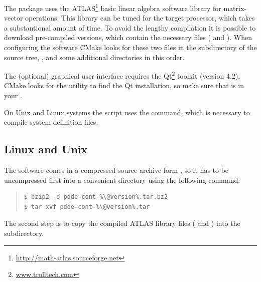 \documentclass[10pt,a4paper]{ddedoc}
\begin{document}
The package uses the ATLAS\footnote{\url{http://math-atlas.sourceforge.net}}
basic linear algebra software library for matrix-vector operations. This library can be
tuned for the target processor, which takes a substantional amount of time.
To avoid the lengthy compilation it is possible to download
pre-compiled versions, which contain the necessary files ( and
). When configuring the software CMake looks for these two files
in the  subdirectory of the source tree, ,  
and some additional directories in this order.

The (optional) graphical user interface requires the Qt\footnote{\url{www.trolltech.com}} 
toolkit (version 4.2). CMake looks for the  utility to find the Qt
installation, so make sure that  is in your .

On Unix and Linux systems the  script uses
the  command, which is necessary to compile system definition files.

\subsection{Linux and Unix}

The software comes in a compressed source archive form
, so it has to be uncompressed first into a
convenient directory using the following command:
{ \small \begin{quote} \begin{lstlisting}[basicstyle=\ttfamily,frame=single]
$ bzip2 -d pdde-cont-%\@version%.tar.bz2
$ tar xvf pdde-cont-%\@version%.tar
\end{lstlisting} \end{quote} } \noindent
The second step is to copy the compiled ATLAS library files (
and ) into the
 subdirectory.
\end{document}

